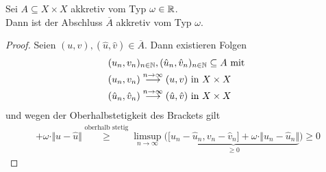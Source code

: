 \begin{lemma}
Sei $A\subseteq X\times X$ akkretiv vom Typ $\omega\in\mathbb{R}$.\\
Dann ist der Abschluss $\overline{A}$ akkretiv vom Typ $\omega$.
\end{lemma}
\begin{proof}
Seien $(u,v),(\hat{u},\hat{v})\in\overline{A}$. Dann existieren Folgen 
\begin{align*}
&(u_n,v_n)_{n\in\mathbb{N}},(\hat{u}_n,\hat{v}_n)_{n\in\mathbb{N}}\subseteq A\text{ mit }\\
&(u_n,v_n)
\stackrel{n\to\infty}{\longrightarrow}
(u,v)\text{ in } X\times X\\
&(\hat{u}_n,\hat{v}_n)
\stackrel{n\to\infty}{\longrightarrow}
(\hat{u},\hat{v})\text{ in } X\times X
\end{align*}
und wegen der Oberhalbstetigkeit des Brackets gilt
\begin{align*}
[u-\hat{u},v-\hat{v}]+\omega\cdot\Vert u-\hat{u}\Vert
\stackrel{\text{oberhalb stetig}}{\geq}
\limsup\limits_{n\to\infty}\Big(\underbrace{\big[ u_n-\hat{u}_n,v_n-\hat{v}_n\big]+\omega\cdot\Vert u_n-\hat{u}_n\Vert}_{\geq0}\Big)
\geq0
\end{align*}
\end{proof}

